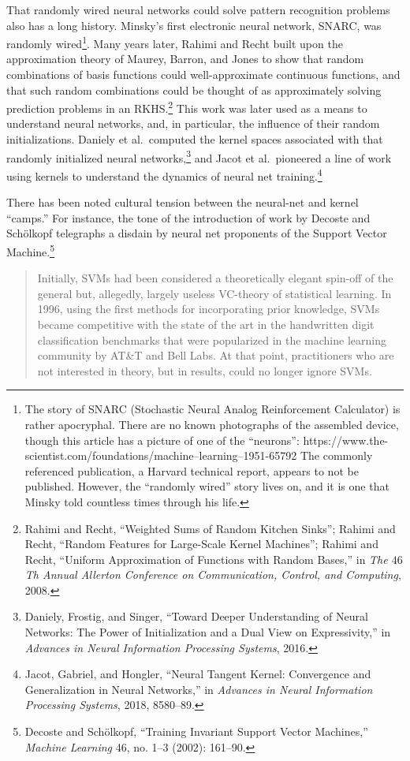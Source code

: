 \documentclass{tufte-book}
\begin{document}
That randomly wired neural networks could solve pattern recognition
problems also has a long history. Minsky's first electronic neural
network, SNARC, was randomly wired\footnote{The story of SNARC
  (Stochastic Neural Analog Reinforcement Calculator) is rather
  apocryphal. There are no known photographs of the assembled device,
  though this article has a picture of one of the ``neurons'':
  https://www.the-scientist.com/foundations/machine--learning--1951-65792
  The commonly referenced publication, a Harvard technical report,
  appears to not be published. However, the ``randomly wired'' story
  lives on, and it is one that Minsky told countless times through his
  life.}. Many years later, Rahimi and Recht built upon the
approximation theory of Maurey, Barron, and Jones to show that random
combinations of basis functions could well-approximate continuous
functions, and that such random combinations could be thought of as
approximately solving prediction problems in an RKHS.\footnote{Rahimi
  and Recht, {``Weighted Sums of Random Kitchen Sinks''}; Rahimi and
  Recht, {``Random Features for Large-Scale Kernel Machines''}; Rahimi
  and Recht, {``Uniform Approximation of Functions with Random Bases,''}
  in \emph{The \(46\)Th Annual Allerton Conference on Communication,
  Control, and Computing}, 2008.} This work was later used as a means to
understand neural networks, and, in particular, the influence of their
random initializations. Daniely et al.~computed the kernel spaces
associated with that randomly initialized neural networks,\footnote{Daniely,
  Frostig, and Singer, {``Toward Deeper Understanding of Neural
  Networks: The Power of Initialization and a Dual View on
  Expressivity,''} in \emph{Advances in Neural Information Processing
  Systems}, 2016.} and Jacot et al.~pioneered a line of work using
kernels to understand the dynamics of neural net training.\footnote{Jacot,
  Gabriel, and Hongler, {``Neural Tangent Kernel: Convergence and
  Generalization in Neural Networks,''} in \emph{Advances in Neural
  Information Processing Systems}, 2018, 8580--89.}

There has been noted cultural tension between the neural-net and kernel
``camps.'' For instance, the tone of the introduction of work by Decoste
and Schölkopf telegraphs a disdain by neural net proponents of the
Support Vector Machine.\footnote{Decoste and Schölkopf, {``Training
  Invariant Support Vector Machines,''} \emph{Machine Learning} 46, no.
  1--3 (2002): 161--90.}

\begin{quote}
Initially, SVMs had been considered a theoretically elegant spin-off of
the general but, allegedly, largely useless VC-theory of statistical
learning. In 1996, using the first methods for incorporating prior
knowledge, SVMs became competitive with the state of the art in the
handwritten digit classification benchmarks that were popularized in the
machine learning community by AT\&T and Bell Labs. At that point,
practitioners who are not interested in theory, but in results, could no
longer ignore SVMs.
\end{quote}
\end{document}
